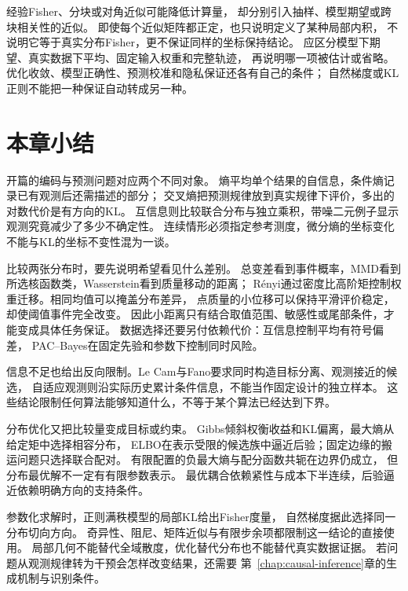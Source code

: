 经验Fisher、分块或对角近似可能降低计算量，
却分别引入抽样、模型期望或跨块相关性的近似。
即使每个近似矩阵都正定，也只说明定义了某种局部内积，
不说明它等于真实分布Fisher，更不保证同样的坐标保持结论。
应区分模型下期望、真实数据下平均、固定输入权重和完整轨迹，
再说明哪一项被估计或省略。
优化收敛、模型正确性、预测校准和隐私保证还各有自己的条件；
自然梯度或KL正则不能把一种保证自动转成另一种。

\section{本章小结}
\label{sec:information-theory-statistical-geometry-summary}

开篇的编码与预测问题对应两个不同对象。
熵平均单个结果的自信息，条件熵记录已有观测后还需描述的部分；
交叉熵把预测规律放到真实规律下评价，多出的对数代价是有方向的KL。
互信息则比较联合分布与独立乘积，带噪二元例子显示观测究竟减少了多少不确定性。
连续情形必须指定参考测度，微分熵的坐标变化不能与KL的坐标不变性混为一谈。

比较两张分布时，要先说明希望看见什么差别。
总变差看到事件概率，MMD看到所选核函数类，Wasserstein看到质量移动的距离；
R\'enyi通过密度比高阶矩控制权重迁移。相同均值可以掩盖分布差异，
点质量的小位移可以保持平滑评价稳定，却使阈值事件完全改变。
因此小距离只有结合取值范围、敏感性或尾部条件，才能变成具体任务保证。
数据选择还要另付依赖代价：互信息控制平均有符号偏差，
PAC--Bayes在固定先验和参数下控制同时风险。

信息不足也给出反向限制。Le Cam与Fano要求同时构造目标分离、观测接近的候选，
自适应观测则沿实际历史累计条件信息，不能当作固定设计的独立样本。
这些结论限制任何算法能够知道什么，不等于某个算法已经达到下界。

分布优化又把比较量变成目标或约束。
Gibbs倾斜权衡收益和KL偏离，最大熵从给定矩中选择相容分布，
ELBO在表示受限的候选族中逼近后验；固定边缘的搬运问题只选择联合配对。
有限配置的负最大熵与配分函数共轭在边界仍成立，
但分布最优解不一定有有限参数表示。
最优耦合依赖紧性与成本下半连续，后验逼近依赖明确方向的支持条件。

参数化求解时，正则满秩模型的局部KL给出Fisher度量，
自然梯度据此选择同一分布切向方向。
奇异性、阻尼、矩阵近似与有限步余项都限制这一结论的直接使用。
局部几何不能替代全域散度，优化替代分布也不能替代真实数据证据。
若问题从观测规律转为干预会怎样改变结果，还需要
第~\ref{chap:causal-inference}章的生成机制与识别条件。
